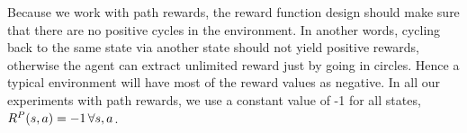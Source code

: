 Because we work with path rewards, the reward function design should
make sure that there are no positive cycles in the environment. In another
words, cycling back to the same state via another state should not yield
positive rewards, otherwise the agent can extract unlimited reward just by
going in circles. Hence a typical environment will have most of the reward
values as negative. In all our experiments with path rewards, we use a constant
value of -1 for all states, $R^P(s, a) = -1 \, \forall s, a$.


